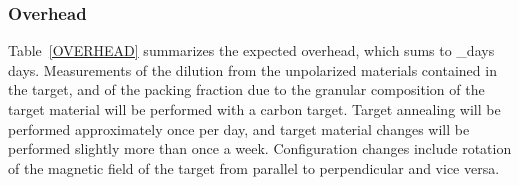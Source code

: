 \subsubsection{Overhead}
%
Table~\ref{OVERHEAD} summarizes the expected overhead, which sums to \overhead_days days.
Measurements
of the dilution from the unpolarized materials contained in the target, and of the packing fraction due to
the granular composition of the target material will be performed with a carbon target.
Target annealing will be performed approximately once per day, and target material changes will be performed slightly more than  once a week.
Configuration changes include rotation of the magnetic field of the target from parallel to perpendicular and vice versa.


